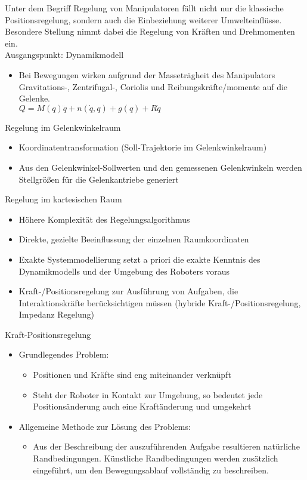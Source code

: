 \documentclass[paper=a4, fontsize=11pt]{scrartcl} %
\numberwithin{equation}{section} %
\numberwithin{figure}{section} %
\numberwithin{table}{section} %
\begin{document}
Unter dem Begriff Regelung von Manipulatoren fällt nicht nur die klassische Positionsregelung, sondern auch die Einbeziehung weiterer Umwelteinflüsse. Besondere Stellung nimmt dabei die Regelung von Kräften und Drehmomenten ein.\\

Ausgangspunkt: Dynamikmodell
\begin{itemize}
\item Bei Bewegungen wirken aufgrund der Masseträgheit des Manipulators Gravitations-, Zentrifugal-, Coriolis und Reibungskräfte/momente auf die Gelenke.\\$Q = M(q) \ddot q + n(\dot q, q) + g(q) + R \dot q$
\end{itemize}

Regelung im Gelenkwinkelraum
\begin{itemize}
\item Koordinatentransformation (Soll-Trajektorie im Gelenkwinkelraum)
\item Aus den Gelenkwinkel-Sollwerten und den gemessenen Gelenkwinkeln werden Stellgrößen für die Gelenkantriebe generiert
\end{itemize}

Regelung im kartesischen Raum
\begin{itemize}
\item Höhere Komplexität des Regelungsalgorithmus
\item Direkte, gezielte Beeinflussung der einzelnen Raumkoordinaten
\end{itemize}

\begin{itemize}
\item Exakte Systemmodellierung setzt a priori die exakte Kenntnis des Dynamikmodells und der Umgebung des Roboters voraus
\item Kraft-/Positionsregelung zur Ausführung von Aufgaben, die Interaktionskräfte berücksichtigen müssen (hybride Kraft-/Positionsregelung, Impedanz Regelung)
\end{itemize}

Kraft-Positionsregelung
\begin{itemize}
\item Grundlegendes Problem:
\begin{itemize}
\item Positionen und Kräfte sind eng miteinander verknüpft
\item Steht der Roboter in Kontakt zur Umgebung, so bedeutet jede Positionsänderung auch eine Kraftänderung und umgekehrt
\end{itemize}
\item Allgemeine Methode zur Lösung des Problems:
\begin{itemize}
\item Aus der Beschreibung der auszuführenden Aufgabe resultieren natürliche Randbedingungen. Künstliche Randbedingungen werden zusätzlich eingeführt, um den Bewegungsablauf vollständig zu beschreiben.
\end{itemize}
\end{itemize}
\end{document}
